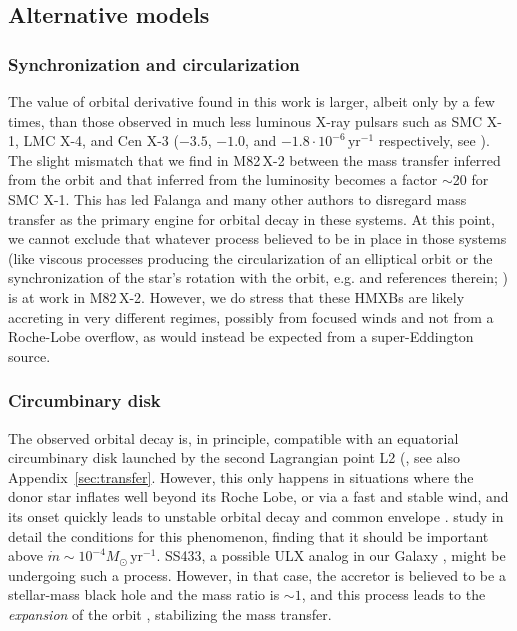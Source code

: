 \documentclass[twocolumn]{aastex631}
\newcommand{\Mtwo}{M82\,X-2\xspace}
\newcommand{\mdot}{\ensuremath{\dot{m}}}
\newcommand{\msun}{\ensuremath{M_{\odot}}\xspace}
\newcommand{\msix}{\ensuremath{10^{-6}}\xspace}
\newcommand{\yrmone}{\ensuremath{\mathrm{yr^{-1}}}\xspace}
\newcommand{\msunyr}{\ensuremath{\msun\,\yrmone}\xspace}
\newcommand{\msixyrmone}{\ensuremath{\msix\,\yrmone}\xspace}
\begin{document}
\subsection{Alternative models}
\subsubsection{Synchronization and circularization}
The value of orbital derivative found in this work is larger, albeit only by a few times, than those observed in much less luminous X-ray pulsars such as SMC X-1, LMC X-4, and Cen X-3 ($-3.5$, $-1.0$, and $-1.8\cdot\msixyrmone$ respectively, see \citealt{falangaEphemerisOrbitalDecay2015}).
The slight mismatch that we find in \Mtwo between the mass transfer inferred from the orbit and that inferred from the luminosity becomes a factor $\sim$20 for SMC X-1.
This has led Falanga and many other authors \citep[e.g.]{levineOrbitalDecayLMC2000,levineDiscoveryOrbitalDecay1993,chernovOrbitalDecayHighMass2020} to disregard mass transfer as the primary engine for orbital decay in these systems.
At this point, we cannot exclude that whatever process believed to be in place in those systems (like viscous processes producing the circularization of an elliptical orbit or the synchronization of the star's rotation with the orbit, e.g.
\citealt{falangaEphemerisOrbitalDecay2015} and references therein; \citealt{chernovOrbitalDecayHighMass2020}) is at work in \Mtwo.
However, we do stress that these HMXBs are likely accreting in very different regimes, possibly from focused winds and not from a Roche-Lobe overflow, as would instead be expected from a super-Eddington source.

\subsubsection{Circumbinary disk}
The observed orbital decay is, in principle, compatible with an equatorial circumbinary disk launched by the second Lagrangian point L2 (\citealt{taurisFormationEvolutionCompact2006}, see also Appendix~\ref{sec:transfer}.
However, this only happens in situations where the donor star inflates well beyond its Roche Lobe, or via a fast and stable wind, and its onset quickly leads to unstable orbital decay and common envelope \citep{misraOriginPulsatingUltraluminous2020}.
\citet{lu2022} study in detail the conditions for this phenomenon, finding that it should be important above $\mdot\sim10^{-4}\msunyr$.
SS433, a possible ULX analog in our Galaxy \citep{fabrikaPropertiesSS433Ultraluminous2006, middletonNuSTARRevealsHidden2021}, might be undergoing such a process.
However, in that case, the accretor is believed to be a stellar-mass black hole \citep{blundellSS433Observation2008} and the mass ratio is $\sim 1$, and this process leads to the \textit{expansion} of the orbit \citep{Cherepashchuk+2021}, stabilizing the mass transfer.
\end{document}
